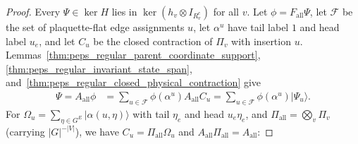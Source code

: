 \begin{proof}\leanok
    Every $\Psi\in\ker H$ lies in $\ker(h_v\otimes I_{R_v^c})$ for all $v$.
    Let $\phi=F_{\mathrm{all}}\Psi$, let $\mathcal F$ be the set of
    plaquette-flat edge assignments $u$, let $\alpha^u$ have tail label $1$
    and head label $u_e$, and let $C_u$ be the closed contraction of $\Pi_v$
    with insertion $u$. Lemmas~\ref{thm:peps_regular_parent_coordinate_support},
    \ref{thm:peps_regular_invariant_state_span},
    and~\ref{thm:peps_regular_closed_physical_contraction} give
    \begin{align}
        \Psi=A_{\mathrm{all}}\phi
         & =\sum_{u\in\mathcal F}\phi(\alpha^u)A_{\mathrm{all}}C_u
        =\sum_{u\in\mathcal F}\phi(\alpha^u)\lvert\Psi_u\rangle.
        \label{eq:peps_regular_flat_expansion}
    \end{align}
    For $\Omega_u=\sum_{\eta\in G^E}\lvert\alpha(u,\eta)\rangle$ with tail
    $\eta_e$ and head $u_e\eta_e$, and $\Pi_{\mathrm{all}}=\bigotimes_v\Pi_v$
    (carrying $|G|^{-|V|}$), we have $C_u=\Pi_{\mathrm{all}}\Omega_u$ and
    $A_{\mathrm{all}}\Pi_{\mathrm{all}}=A_{\mathrm{all}}$:


\end{proof}
